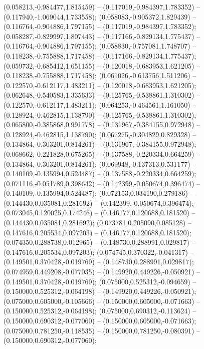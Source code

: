  (0.058213,-0.984477,1.815459) -- (0.117019,-0.984397,1.783352) -- (0.117940,-1.069044,1.733558);
 (0.058083,-0.905372,1.829439) -- (0.116764,-0.904886,1.797155) -- (0.117019,-0.984397,1.783352);
 (0.058287,-0.829997,1.807443) -- (0.117166,-0.829134,1.775437) -- (0.116764,-0.904886,1.797155);
 (0.058830,-0.757081,1.748707) -- (0.118238,-0.755888,1.717458) -- (0.117166,-0.829134,1.775437);
 (0.059732,-0.685412,1.651155) -- (0.120018,-0.683953,1.621205) -- (0.118238,-0.755888,1.717458);
 (0.061026,-0.613756,1.511206) -- (0.122570,-0.612117,1.483211) -- (0.120018,-0.683953,1.621205);
 (0.062648,-0.540583,1.335633) -- (0.125765,-0.538861,1.310302) -- (0.122570,-0.612117,1.483211);
 (0.064253,-0.464561,1.161050) -- (0.128924,-0.462815,1.138790) -- (0.125765,-0.538861,1.310302);
 (0.065800,-0.385868,0.991778) -- (0.131967,-0.384155,0.972948) -- (0.128924,-0.462815,1.138790);
 (0.067275,-0.304829,0.829328) -- (0.134864,-0.303201,0.814261) -- (0.131967,-0.384155,0.972948);
 (0.068662,-0.221828,0.675265) -- (0.137588,-0.220334,0.664259) -- (0.134864,-0.303201,0.814261);
 (0.069948,-0.137313,0.531177) -- (0.140109,-0.135994,0.524487) -- (0.137588,-0.220334,0.664259);
 (0.071116,-0.051789,0.398642) -- (0.142399,-0.050674,0.396474) -- (0.140109,-0.135994,0.524487);
 (0.072153,0.034190,0.279186) -- (0.144430,0.035081,0.281692) -- (0.142399,-0.050674,0.396474);
 (0.073045,0.120025,0.174246) -- (0.146177,0.120688,0.181520) -- (0.144430,0.035081,0.281692);
 (0.073781,0.205090,0.085128) -- (0.147616,0.205534,0.097203) -- (0.146177,0.120688,0.181520);
 (0.074350,0.288738,0.012965) -- (0.148730,0.288991,0.029817) -- (0.147616,0.205534,0.097203);
 (0.074745,0.370322,-0.041317) -- (0.149501,0.370428,-0.019769) -- (0.148730,0.288991,0.029817);
 (0.074959,0.449208,-0.077035) -- (0.149920,0.449226,-0.050921) -- (0.149501,0.370428,-0.019769);
 (0.075000,0.525312,-0.094659) -- (0.150000,0.525312,-0.064198) -- (0.149920,0.449226,-0.050921);
 (0.075000,0.605000,-0.105666) -- (0.150000,0.605000,-0.071663) -- (0.150000,0.525312,-0.064198);
 (0.075000,0.690312,-0.113624) -- (0.150000,0.690312,-0.077060) -- (0.150000,0.605000,-0.071663);
 (0.075000,0.781250,-0.118535) -- (0.150000,0.781250,-0.080391) -- (0.150000,0.690312,-0.077060);
